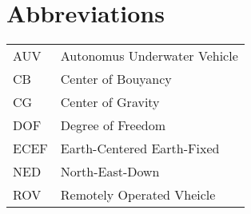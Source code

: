 \chapter{Abbreviations}
\begin{center}
\begin{tabular}{|l|l|}
\hline
AUV & Autonomus Underwater Vehicle \\
CB & Center of Bouyancy\\
CG & Center of Gravity \\
DOF & Degree of Freedom \\
ECEF & Earth-Centered Earth-Fixed \\
NED & North-East-Down \\
ROV & Remotely Operated Vheicle \\
\hline
\end{tabular}
\end{center}